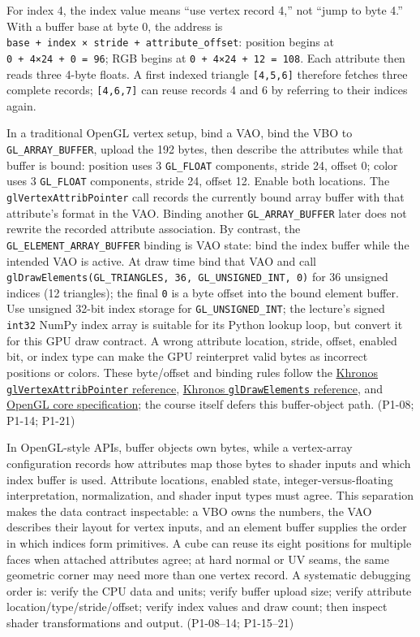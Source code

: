 For index 4, the index value means ``use vertex record 4,'' not ``jump to byte 4.'' With a buffer base at byte 0, the address is \texttt{base\ +\ index\ ×\ stride\ +\ attribute\_offset}: position begins at \texttt{0\ +\ 4×24\ +\ 0\ =\ 96}; RGB begins at \texttt{0\ +\ 4×24\ +\ 12\ =\ 108}. Each attribute then reads three 4-byte floats. A first indexed triangle \texttt{{[}4,5,6{]}} therefore fetches three complete records; \texttt{{[}4,6,7{]}} can reuse records 4 and 6 by referring to their indices again.

In a traditional OpenGL vertex setup, bind a VAO, bind the VBO to \texttt{GL\_ARRAY\_BUFFER}, upload the 192 bytes, then describe the attributes while that buffer is bound: position uses 3 \texttt{GL\_FLOAT} components, stride 24, offset 0; color uses 3 \texttt{GL\_FLOAT} components, stride 24, offset 12. Enable both locations. The \texttt{glVertexAttribPointer} call records the currently bound array buffer with that attribute's format in the VAO. Binding another \texttt{GL\_ARRAY\_BUFFER} later does not rewrite the recorded attribute association. By contrast, the \texttt{GL\_ELEMENT\_ARRAY\_BUFFER} binding is VAO state: bind the index buffer while the intended VAO is active. At draw time bind that VAO and call \texttt{glDrawElements(GL\_TRIANGLES,\ 36,\ GL\_UNSIGNED\_INT,\ 0)} for 36 unsigned indices (12 triangles); the final \texttt{0} is a byte offset into the bound element buffer. Use unsigned 32-bit index storage for \texttt{GL\_UNSIGNED\_INT}; the lecture's signed \texttt{int32} NumPy index array is suitable for its Python lookup loop, but convert it for this GPU draw contract. A wrong attribute location, stride, offset, enabled bit, or index type can make the GPU reinterpret valid bytes as incorrect positions or colors. These byte/offset and binding rules follow the \href{https://registry.khronos.org/OpenGL-Refpages/gl4/html/glVertexAttribPointer.xhtml}{Khronos \texttt{glVertexAttribPointer} reference}, \href{https://registry.khronos.org/OpenGL-Refpages/gl4/html/glDrawElements.xhtml}{Khronos \texttt{glDrawElements} reference}, and \href{https://registry.khronos.org/OpenGL/specs/gl/glspec43.core.pdf}{OpenGL core specification}; the course itself defers this buffer-object path. (P1-08; P1-14; P1-21)

In OpenGL-style APIs, buffer objects own bytes, while a vertex-array configuration records how attributes map those bytes to shader inputs and which index buffer is used. Attribute locations, enabled state, integer-versus-floating interpretation, normalization, and shader input types must agree. This separation makes the data contract inspectable: a VBO owns the numbers, the VAO describes their layout for vertex inputs, and an element buffer supplies the order in which indices form primitives. A cube can reuse its eight positions for multiple faces when attached attributes agree; at hard normal or UV seams, the same geometric corner may need more than one vertex record. A systematic debugging order is: verify the CPU data and units; verify buffer upload size; verify attribute location/type/stride/offset; verify index values and draw count; then inspect shader transformations and output. (P1-08--14; P1-15--21)

